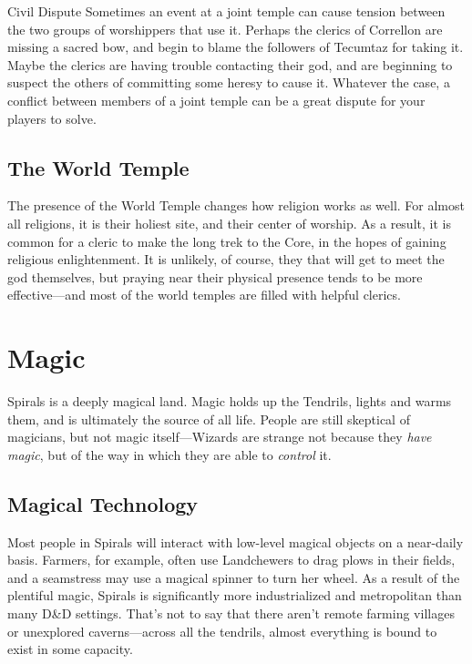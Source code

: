 \begin{multicols}{2}
\begin{adventureidea}{Civil Dispute}
Sometimes an event at a joint temple can cause tension between the two groups of worshippers that use it.
Perhaps the clerics of Correllon are missing a sacred bow, and begin to blame the followers of Tecumtaz for taking it.
Maybe the clerics are having trouble contacting their god, and are beginning to suspect the others of committing some heresy to cause it.
Whatever the case, a conflict between members of a joint temple can be a great dispute for your players to solve.
\end{adventureidea}

\subsection{The World Temple}
The presence of the World Temple changes how religion works as well.
For almost all religions, it is their holiest site, and their center of worship.
As a result, it is common for a cleric to make the long trek to the Core, in the hopes of gaining religious enlightenment.
It is unlikely, of course, they that will get to meet the god themselves, but praying near their physical presence tends to be more effective---and most of the world temples are filled with helpful clerics.

\section{Magic}
Spirals is a deeply magical land.
Magic holds up the Tendrils, lights and warms them, and is ultimately the source of all life.
People are still skeptical of magicians, but not magic itself---Wizards are strange not because they \textit{have magic}, but of the way in which they are able to \textit{control} it.

\subsection{Magical Technology}
Most people in Spirals will interact with low-level magical objects on a near-daily basis.
Farmers, for example, often use Landchewers to drag plows in their fields, and a seamstress may use a magical spinner to turn her wheel.
As a result of the plentiful magic, Spirals is significantly more industrialized and metropolitan than many D\&D settings.
That's not to say that there aren't remote farming villages or unexplored caverns---across all the tendrils, almost everything is bound to exist in some capacity.


\end{multicols}
